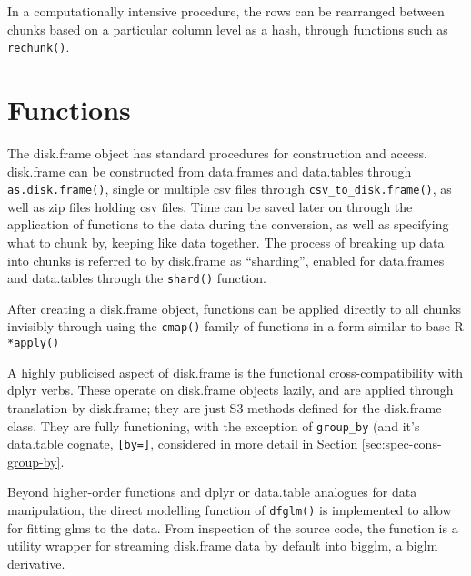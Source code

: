 \documentclass[10pt,a4paper]{article}
\begin{document}
In a computationally intensive procedure, the rows can be rearranged
between chunks based on a particular column level as a hash, through
functions such as \texttt{rechunk()}.

\section{Functions}
\label{sec:functions}

The disk.frame object has standard procedures for construction and
access. disk.frame can be constructed from data.frames and data.tables
through \texttt{as.disk.frame()}, single or multiple csv files through
\texttt{csv\_to\_disk.frame()}, as well as zip files holding csv files.
Time can be saved later on through the application of functions to the
data during the conversion, as well as specifying what to chunk by,
keeping like data together. The process of breaking up data into
chunks is referred to by disk.frame as ``sharding'', enabled for
data.frames and data.tables through the \texttt{shard()} function.

After creating a disk.frame object, functions can be applied directly
to all chunks invisibly through using the \texttt{cmap()} family of
functions in a form similar to base R \texttt{*apply()}

A highly publicised aspect of disk.frame is the functional
cross-compatibility with dplyr verbs. These operate on disk.frame
objects lazily, and are applied through translation by disk.frame;
they are just S3 methods defined for the disk.frame class. They are
fully functioning, with the exception of \texttt{group\_by} (and it's
data.table cognate, \texttt{[by=]}, considered in more detail in
Section \ref{sec:spec-cons-group-by}.

Beyond higher-order functions and dplyr or data.table analogues for
data manipulation, the direct modelling function of \texttt{dfglm()}
is implemented to allow for fitting glms to the data. From inspection
of the source code, the function is a utility wrapper for streaming
disk.frame data by default into bigglm, a biglm derivative.
\end{document}
